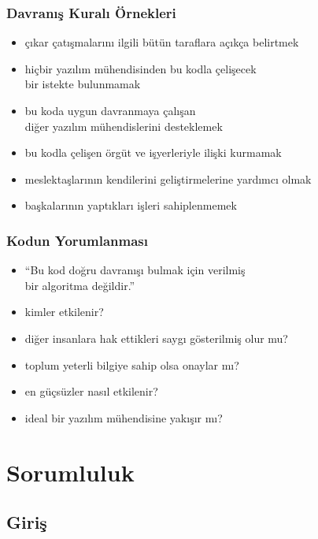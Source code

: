 \documentclass[dvipsnames]{beamer}
\theoremstyle{plain}
\begin{document}
\begin{frame}
  \frametitle{Davranış Kuralı Örnekleri}

  \begin{itemize}
    \item çıkar çatışmalarını ilgili bütün taraflara açıkça belirtmek
    \item hiçbir yazılım mühendisinden bu kodla çelişecek\\
      bir istekte bulunmamak
    \item bu koda uygun davranmaya çalışan\\
      diğer yazılım mühendislerini desteklemek
    \item bu kodla çelişen örgüt ve işyerleriyle ilişki kurmamak
    \item meslektaşlarının kendilerini geliştirmelerine yardımcı olmak
    \item başkalarının yaptıkları işleri sahiplenmemek
  \end{itemize}
\end{frame}

\begin{frame}
  \frametitle{Kodun Yorumlanması}

  \begin{itemize}
    \item ``Bu kod doğru davranışı bulmak için verilmiş\\
      bir algoritma \alert{değildir}.''

    \pause
    \bigskip
    \item kimler etkilenir?
    \item diğer insanlara hak ettikleri saygı gösterilmiş olur mu?
    \item toplum yeterli bilgiye sahip olsa onaylar mı?
    \item en güçsüzler nasıl etkilenir?
    \item ideal bir yazılım mühendisine yakışır mı?
  \end{itemize}
\end{frame}

\section{Sorumluluk}

\subsection{Giriş}
\end{document}
